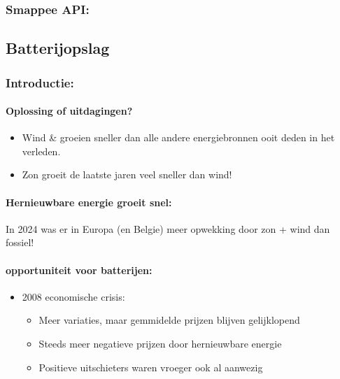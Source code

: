 \documentclass[12pt]{article}
\begin{document}
\subsubsection{Smappee API:}
\subsection{Batterijopslag}
\subsubsection{Introductie:}
\paragraph{Oplossing of uitdagingen?}
\begin{itemize}
    \item Wind \& groeien sneller dan alle andere energiebronnen ooit deden in het verleden.
    \item Zon groeit de laatste jaren veel sneller dan wind!
\end{itemize}
\paragraph{Hernieuwbare energie groeit snel:}
In 2024 was er in Europa (en Belgie) meer opwekking door zon + wind dan fossiel!
\paragraph{opportuniteit voor batterijen:}
\begin{itemize}
    \item 2008 economische crisis:\begin{itemize}
        \item Meer variaties, maar gemmidelde prijzen blijven gelijklopend
        \item Steeds meer negatieve prijzen door hernieuwbare energie
        \item Positieve uitschieters waren vroeger ook al aanwezig 
    \end{itemize}
\end{itemize}
\end{document}
